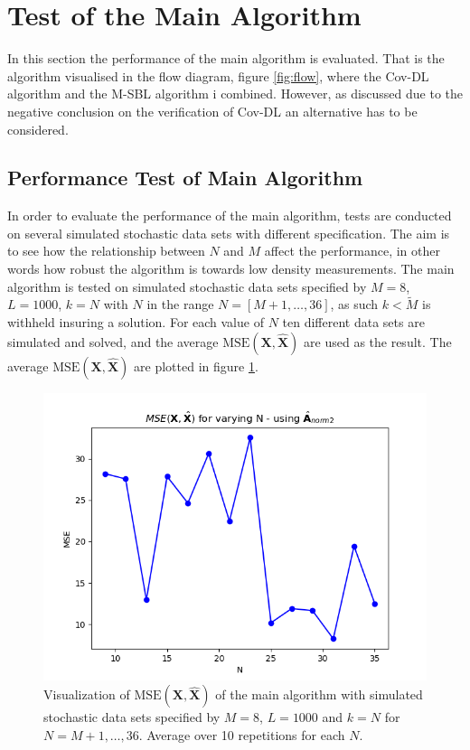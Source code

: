 \section{Test of the Main Algorithm}\label{sec:test_base}
In this section the performance of the main algorithm is evaluated. That is the algorithm visualised in the flow diagram, figure \ref{fig:flow}, where the Cov-DL algorithm and the M-SBL algorithm i combined. However, as discussed due to the negative conclusion on the verification of Cov-DL an alternative has to be considered.  
 
  

\subsection{Performance Test of Main Algorithm}\label{sec:Main_test}
In order to evaluate the performance of the main algorithm, tests are conducted on several simulated stochastic data sets with different specification. 
The aim is to see how the relationship between $N$ and $M$ affect the performance, in other words how robust the algorithm is towards low density measurements. 
The main algorithm is tested on simulated stochastic data sets specified by $M=8$, $L=1000$, $k=N$ with $N$ in the range $N = [M+1,\dots,36]$, as such $k<\widetilde{M}$ is withheld insuring a solution.
For each value of $N$ ten different data sets are simulated and solved, and the average $\text{MSE}(\mathbf{X}, \hat{\mathbf{X}})$ are used as the result. 
The average $\text{MSE}(\mathbf{X}, \hat{\mathbf{X}})$ are plotted in figure \ref{fig:varyN1}.
\begin{figure}[H]
    \centering
	\includegraphics[scale=0.5]{figures/ch_6/varyN1.png}
	\caption{Visualization of $\text{MSE}(\mathbf{X}, \hat{\mathbf{X}})$ of the main algorithm with simulated stochastic data sets specified by $M = 8$, $L=1000$ and $k = N$ for $N = M+1, \hdots , 36$. Average over 10 repetitions for each $N$.}
	\label{fig:varyN1}
\end{figure}
